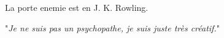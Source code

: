 La porte enemie est en J. K. Rowling.

"\emph{Je ne suis pas un psychopathe, je suis juste très créatif.}"
